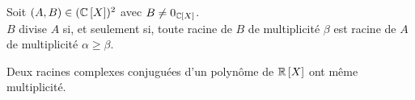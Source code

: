 \begin{defprop}
    Soit \((A, B) \in (\mathbb{C} \left[X\right])^2\) avec \(B\neq 0_{\mathbb{C}\left[X\right]}\).\\
    \(B\) divise \(A\) si, et seulement si, toute racine de \(B\) de multiplicité \(\beta\) est racine de \(A\) de multiplicité \(\alpha \geq \beta\).
\end{defprop}

\begin{defprop}
    Deux racines complexes conjuguées d’un polynôme de \(\mathbb{R} \left[X\right]\) ont même multiplicité.
\end{defprop}